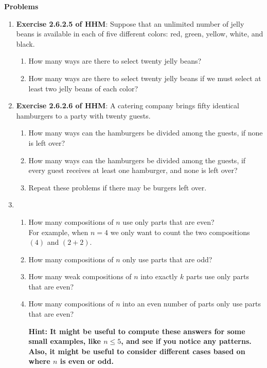 \documentclass[11pt]{article}
\begin{document}
\centerline{ \bf \Large Problems}


\begin{enumerate}

\item {\bf Exercise 2.6.2.5 of HHM}:  Suppose that an unlimited number of jelly beans is available in each of five different colors: red, green, yellow, white, and black.  
\begin{enumerate}
\item How many ways are there to select twenty jelly beans?

\item How many ways are there to select twenty jelly beans if we must select at least two jelly beans of each color?

\end{enumerate}


\item {\bf Exercise 2.6.2.6 of HHM}:
A catering company brings fifty identical hamburgers to a party with twenty guests.  
\begin{enumerate}
\item How many ways can the hamburgers be divided among the guests, if none is left over?

\item How many ways can the hamburgers be divided among the guests, if every guest receives at least one hamburger, and none is left over?

\item Repeat these problems if there may be burgers left over.
\end{enumerate}


\item 
\begin{enumerate}
\item How many compositions of $n$ use only parts that are even?  \\
For example, when $n = 4$ we only want to count the two compositions $(4)$ and $(2+2)$.
\item How many compositions of $n$ only use parts that are odd?
\item How many weak compositions of $n$ into exactly $k$ parts use only parts that are even?
\item How many compositions of $n$ into an even number of parts only use parts that are even?  

{\bf Hint: It might be useful to compute these answers for some small examples, like $n \le 5$, and see if you notice any patterns.  Also, it might be useful to consider different cases based on where $n$ is even or odd.}
\end{enumerate}


\end{enumerate}
\end{document}
